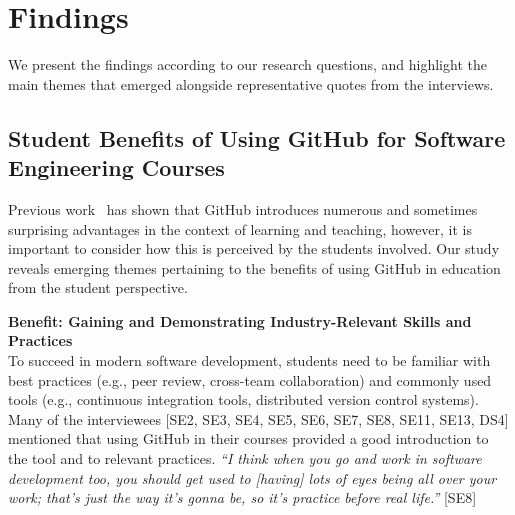 \section{Findings} %
\label{sec:Findings}

We present the findings according to our research questions, and highlight the main themes that emerged alongside representative quotes from the interviews.

\subsection{Student Benefits of Using GitHub for Software Engineering Courses}
Previous work~\cite{zagalsky2015emergence} has shown that GitHub introduces numerous and sometimes surprising advantages in the context of learning and teaching, however, it is important to consider how this is perceived by the students involved. Our study reveals emerging themes pertaining to the benefits of using GitHub in education from the student perspective.


\textbf{Benefit: Gaining and Demonstrating Industry-Relevant Skills and Practices}\\
To succeed in modern software development, students need to be familiar with best practices (e.g., peer review, cross-team collaboration) and commonly used tools (e.g., continuous integration tools, distributed version control systems). Many of the interviewees [SE2, SE3, SE4, SE5, SE6, SE7, SE8, SE11, SE13, DS4] mentioned that using GitHub in their courses provided a good introduction to the tool and to relevant practices. \textit{``I think when you go and work in software development too, you should get used to [having] lots of eyes being all over your work; that's just the way it's gonna be, so it's practice before real life.''} [SE8]

